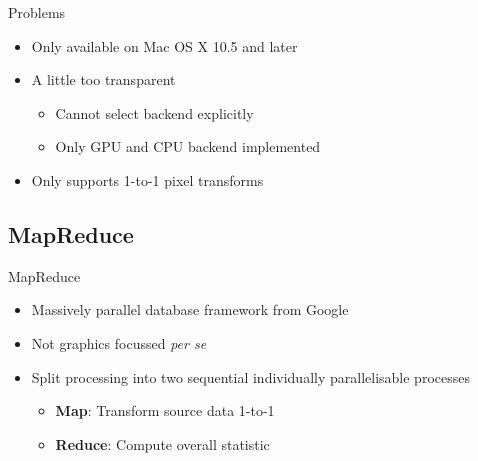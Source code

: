 \documentclass{beamer}
\newcommand{\bi}{\begin{itemize}}
\newcommand{\ei}{\end{itemize}}
\begin{document}
\begin{frame}
  C}]{coreimage-example.m}
\end{frame}

\begin{frame}
  
\end{frame}

\begin{frame}{Problems}
  \bi
    \item Only available on Mac OS X 10.5 and later
    \item A little too transparent
    \bi
      \item Cannot select backend explicitly
      \item Only GPU and CPU backend implemented
    \ei
    \item Only supports 1-to-1 pixel transforms 
  \ei
\end{frame}


\subsection{MapReduce} %

\begin{frame}{MapReduce}
  \bi
    \item Massively parallel database framework from Google
    \item Not graphics focussed \emph{per se}
    \item Split processing into two sequential individually parallelisable
    processes
    \bi
      \item \textbf{Map}: Transform source data 1-to-1 
      \item \textbf{Reduce}: Compute overall statistic
    \ei
  \ei
\end{frame}
\end{document}
